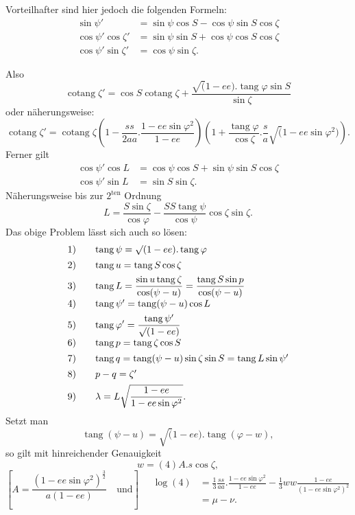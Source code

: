 Vorteilhafter sind hier jedoch die folgenden Formeln:
\[
\begin{aligned}
\sin\psi'&=\sin\psi\cos S-\cos\psi\sin S\cos\zeta\\
\cos\psi'\cos\zeta'&=\sin\psi\sin S+\cos\psi\cos S\cos\zeta\\
\cos\psi'\sin\zeta'&=\cos\psi\sin\zeta.
\end{aligned}
\]

\clearpage
\noindent{}\makebox[12mm][r]{}\par\medskip
Also
\[
\operatorname{cotang}\zeta'=\cos S\operatorname{cotang}\zeta
+\frac{\surd(1-ee).\operatorname{tang}\varphi\sin S}{\sin\zeta}
\]
\noindent oder näherungsweise:
\[
\operatorname{cotang}\zeta'=\operatorname{cotang}\zeta
\left(1-\frac{ss}{2aa}.\frac{1-ee\sin\varphi^2}{1-ee}\right)
\left(1+\frac{\operatorname{tang}\varphi}{\cos\zeta}.\frac sa\surd(1-ee\sin\varphi^2)\right).
\]
\noindent Ferner gilt
\[
\begin{aligned}
\cos\psi'\cos L&=\cos\psi\cos S+\sin\psi\sin S\cos\zeta\\
\cos\psi'\sin L&=\sin S\sin\zeta.
\end{aligned}
\]
\noindent Näherungsweise bis zur \(2^{\text{ten}}\) Ordnung
\[
L=\frac{S\sin\zeta}{\cos\varphi}
-\frac{SS\operatorname{tang}\psi}{\cos\psi}\cos\zeta\sin\zeta.
\]
Das obige Problem lässt sich auch so lösen:
\[
\begin{array}{r@{\qquad}l}
1)&\operatorname{tang}\psi=\surd(1-ee).\operatorname{tang}\varphi\\[1ex]
2)&\operatorname{tang}u=\operatorname{tang}S\cos\zeta\\[1ex]
3)&\displaystyle\operatorname{tang}L=\frac{\sin u\operatorname{tang}\zeta}{\cos(\psi-u)}
=\frac{\operatorname{tang}S\sin p}{\cos(\psi-u)}\\[1.5ex]
4)&\operatorname{tang}\psi'=\operatorname{tang}(\psi-u)\cos L\\[1ex]
5)&\displaystyle\operatorname{tang}\varphi'=\frac{\operatorname{tang}\psi'}{\surd(1-ee)}\\[1.5ex]
6)&\operatorname{tang}p=\operatorname{tang}\zeta\cos S\\[1ex]
7)&\operatorname{tang}q=\operatorname{tang}(\psi-u)\sin\zeta\sin S=\operatorname{tang}L\sin\psi'\\[1ex]
8)&p-q=\zeta'\\[1ex]
9)&\displaystyle\lambda=L\sqrt{\frac{1-ee}{1-ee\sin\varphi^2}}.
\end{array}
\]
Setzt man
\[
\operatorname{tang}(\psi-u)=\surd(1-ee).\operatorname{tang}(\varphi-w),
\]
\noindent so gilt mit hinreichender Genauigkeit
\[
w=(4)A.s\cos\zeta,
\]
\begingroup\small
\[
\left[A=\frac{(1-ee\sin\varphi^2)^{\frac32}}{a(1-ee)}\quad\text{und}\right]
\quad\begin{aligned}
\log(4)&=\tfrac13\frac{ss}{aa}.\frac{1-ee\sin\varphi^2}{1-ee}
-\tfrac13ww\frac{1-ee}{(1-ee\sin\varphi^2)^2}\\
&=\mu-\nu.
\end{aligned}
\]
\endgroup

